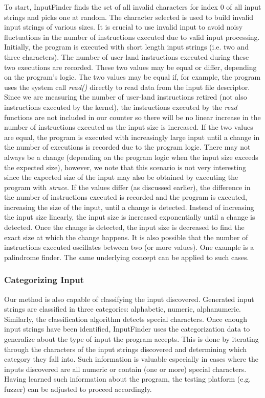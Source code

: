 \documentclass{acm_proc_article-sp}
\def \tool {InputFinder}
\begin{document}
To start, \tool{} finds the set of all invalid characters for index 0 of all input strings and picks one at random.
The character selected is used to build invalid input strings of various sizes.
It is crucial to use invalid input to avoid noisy fluctuations in the number of instructions executed due to valid input processing.
Initially, the program is executed with short length input strings (i.e. two and three characters).
The number of user-land instructions executed during these two executions are recorded.
These two values may be equal or differ, depending on the program's logic.
The two values may be equal if, for example, the program uses the system call \textit{read()} directly to read data from the input file descriptor.
Since we are measuring the number of user-land instructions retired (not also instructions executed by the kernel), the instructions executed by the \textit{read} functions are not included in our counter so there will be no linear increase in the number of instructions executed as the input size is increased.
If the two values are equal, the program is executed with increasingly large input until a change in the number of executions is recorded due to the program logic.
There may not always be a change (depending on the program logic when the input size exceeds the expected size), however, we note that this scenario is not very interesting since the expected size of the input may also be obtained by executing the program with \textit{strace}.
If the values differ (as discussed earlier), the difference in the number of instructions executed is recorded and the program is executed, increasing the size of the input, until a change is detected.
Instead of increasing the input size linearly, the input size is increased exponentially until a change is detected.
Once the change is detected, the input size is decreased to find the exact size at which the change happens.
It is also possible that the number of instructions executed oscillates between two (or more values).
One example is a palindrome finder.
The same underlying concept can be applied to such cases.

\subsubsection{Categorizing Input}
Our method is also capable of classifying the input discovered.
Generated input strings are classified in three categories: alphabetic, numeric, alphanumeric.
Similarly, the classification algorithm detects special characters.
Once enough input strings have been identified, \tool{} uses the categorization data to generalize about the type of input the program accepts.
This is done by iterating through the characters of the input strings discovered and determining which category they fall into.
Such information is valuable especially in cases where the inputs discovered are all numeric or contain (one or more) special characters.
Having learned such information about the program, the testing platform (e.g. fuzzer) can be adjusted to proceed accordingly.
\end{document}
